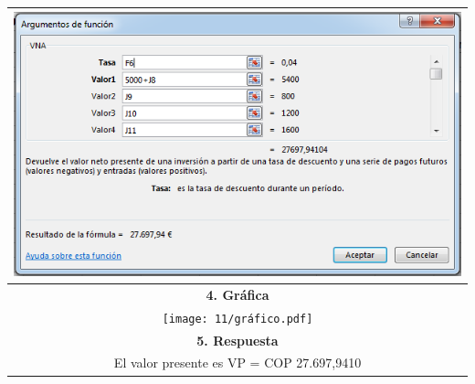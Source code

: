 \begin{center}
\begin{longtable}[H]{|p{0.5\linewidth}|p{0.5\linewidth}|}
  \multicolumn{2}{|c|}{ \includegraphics[trim=-5 -5 -5 -5 ,width=0.7\columnwidth]{11/excel1.png}}                                                                                                    \\ \hline
  \multicolumn{2}{|c|}{\cellcolor[HTML]{FFB183}\textbf{4. Gráfica}}                                                                                                                                  \\ \hline
  \multicolumn{2}{|c|}{ \texttt{[image: 11/gráfico.pdf]}}                                                                                                   \\ \hline
  \multicolumn{2}{|c|}{\cellcolor[HTML]{FFB183}\textbf{5. Respuesta}}                                                                                                                                \\ \hline
  \multicolumn{2}{|c|}{El valor presente es VP =  COP 27.697,9410}                                                                                                                                      \\ \hline
 \end{longtable}
\end{center}
